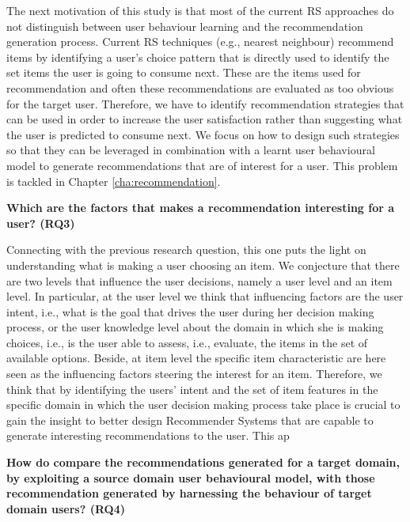 	The next motivation of this study is that most of the current RS approaches do not distinguish between user behaviour learning and the recommendation  generation process. Current RS techniques (e.g., nearest neighbour) recommend items by identifying a user's choice pattern that is directly used to identify the set items the user is going to consume next. These are the items used for recommendation and often these recommendations are evaluated as too obvious for the target user.
	Therefore, we have to identify recommendation strategies that can be used in order to increase the user satisfaction rather than suggesting what the user is predicted to consume next.
	We focus on how to design such strategies so that they can be leveraged in combination with a learnt user behavioural model to generate recommendations that are of interest for a user. This problem is tackled in Chapter \ref{cha:recommendation}. \newline
	
	\noindent \textbf{Which are the factors that makes a recommendation interesting for a user? (RQ3)} 
	
	Connecting with the previous research question, this one puts the light on understanding what is making a user choosing an item. 
	We conjecture that there are two levels that influence the user decisions, namely a user level and an item level.
	In particular, at the user level we think that influencing factors are the user intent, i.e., what is the goal that drives the user during her decision making process, or the user knowledge level about the domain in which she is making choices, i.e., is the user able to assess, i.e., evaluate, the items in the set of available options. Beside, at item level the specific item characteristic are here seen as the influencing factors steering the interest for an item.
	Therefore, we think that by identifying the users' intent and the set of item features in the specific domain in which the user decision making process take place is crucial to gain the insight to better design Recommender Systems that are capable to generate interesting recommendations to the user. This ap \newline
	
	\noindent \textbf{How do compare the recommendations generated for a target domain, by exploiting a source domain user behavioural model, with those recommendation generated by harnessing the behaviour of target domain users? (RQ4)} 
	
